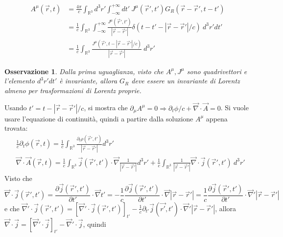 \documentclass[10pt, a4paper]{scrartcl}
\numberwithin{equation}{subsection}
\theoremstyle{style1}
\newtheorem{osservazione}{Osservazione}[section]
\newenvironment{boxenv}[1][]{
    \begin{eqbox}[#1]
    }{
   \end{eqbox}
}
\begin{document}
\begin{boxenv}[]
\begin{equation}
	\begin{split}
		A^\mu (\vec{r},t)& = \frac{4\pi}{c} \int_{\mathbb{R}^3} d^3 r '\int_{-\infty} ^{+\infty} dt' \ J^\mu (\vec{r}', t') G_R(\vec{r}-\vec{r}', t - t') \\
				 &= \frac{1}{c}\int_{\mathbb{R}^3} \int_{-\infty } ^{+\infty} \frac{J^\mu (\vec{r}', t')}{\left\lvert \vec{r}-\vec{r}' \right\rvert }\delta (t-t' - \left\lvert \vec{r}-\vec{r}' \right\rvert / c) \ d^3 r' dt'\\
				 &=\frac{1}{c}\int_{\mathbb{R}^3} \frac{J^\mu (\vec{r}', t- \left\lvert \vec{r}-\vec{r}' \right\rvert /c)}{\left\lvert \vec{r}-\vec{r}' \right\rvert  } \ d^3 r'
	\end{split} 
\end{equation}
\end{boxenv}
\begin{osservazione}
	Dalla prima uguaglianza, visto che $A^\mu , J^\mu $ sono quadrivettori e l'elemento $d^3 r ' dt'$ \`e invariante, allora $G_R$ deve essere un invariante di Lorentz almeno per trasformazioni di Lorentz proprie.
\end{osservazione}
\noindent Usando $t' = t - \left\lvert \vec{r}-\vec{r}' \right\rvert /c$, si mostra che $\partial _\mu A^\mu  =0\Rightarrow \partial _t \phi  / c + \vec{\nabla }\cdot \vec{A}=0$. Si vuole usare l'equazione di continuit\`a, quindi a partire dalla soluzione $A^\mu $ appena trovata:
\[
\begin{split}
	& \frac{1}{c}\partial _t \phi (\vec{r},t) = \frac{1}{c} \int_{\mathbb{R}^3} \frac{\partial _t \rho (\vec{r}',t')}{\left\lvert \vec{r}-\vec{r}' \right\rvert }d^3r'\\
	&\vec{\nabla }\cdot \vec{A} (\vec{r},t) = \frac{1}{c}\int_{\mathbb{R}^3} \vec{j}(\vec{r}',t') \cdot \vec{\nabla } \frac{1}{\left\lvert \vec{r}-\vec{r}' \right\rvert } d^3 r' + \frac{1}{c}\int_{\mathbb{R}^3} \frac{1}{\left\lvert \vec{r}-\vec{r}' \right\rvert } \vec{\nabla }\cdot \vec{j}(\vec{r}',t') \ d^3 r'
\end{split}
\] 
Visto che 
\[
	\vec{\nabla }\cdot \vec{j}(\vec{r}',t') = \frac{\partial \vec{j}(\vec{r}',t')}{\partial t'}\cdot  \vec{\nabla }t'=-\frac{1}{c} \frac{\partial \vec{j}(\vec{r}',t')}{\partial t'} \cdot \vec{\nabla } \left\lvert \vec{r}-\vec{r}' \right\rvert = \frac{1}{c}\frac{\partial \vec{j}(\vec{r}',t')}{\partial t'} \cdot \vec{\nabla }' \left\lvert \vec{r}-\vec{r}' \right\rvert 
\] 
e che $\vec{\nabla }'\cdot \vec{j}(\vec{r}',t') = \left[ \vec{\nabla }'\cdot \vec{j}(\vec{r}',t') \right]_{t'} - \frac{1}{c}\partial _{t'} \vec{j}(\vec{r'},t') \cdot \vec{\nabla }' \left\lvert \vec{r}-\vec{r}' \right\rvert  $, allora $\vec{\nabla }\cdot \vec{j} = \left[ \vec{\nabla }'\cdot \vec{j} \right] _{t'} - \vec{\nabla }'\cdot \vec{j}$, quindi
\end{document}
